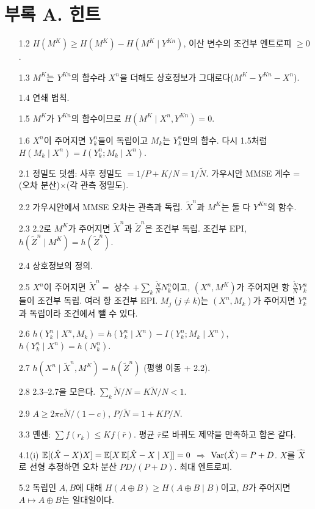 \newpage
\section*{부록 A. 힌트}
\begin{itemize}[leftmargin=2.2em]
\item[1.2] $H(M^K)\ge H(M^K)-H(M^K\mid Y^{Kn})$, 이산 변수의 조건부 엔트로피 $\ge0$.
\item[1.3] $M^K$는 $Y^{Kn}$의 함수라 $X^n$을 더해도 상호정보가 그대로다($M^K-Y^{Kn}-X^n$).
\item[1.4] 연쇄 법칙.
\item[1.5] $M^K$가 $Y^{Kn}$의 함수이므로 $H(M^K\mid X^n,Y^{Kn})=0$.
\item[1.6] $X^n$이 주어지면 $Y_k^n$들이 독립이고 $M_k$는 $Y_k^n$만의 함수. 다시 1.5처럼 $H(M_k\mid X^n)=I(Y_k^n;M_k\mid X^n)$.
\item[2.1] 정밀도 덧셈: 사후 정밀도 $=1/P+K/N=1/\tilde N$. 가우시안 MMSE 계수 = (오차 분산)$\times$(각 관측 정밀도).
\item[2.2] 가우시안에서 MMSE 오차는 관측과 독립. $\tilde X^n$과 $M^K$는 둘 다 $Y^{Kn}$의 함수.
\item[2.3] 2.2로 $M^K$가 주어지면 $\tilde X^n$과 $\tilde Z^n$은 조건부 독립. 조건부 EPI, $h(\tilde Z^n\mid M^K)=h(\tilde Z^n)$.
\item[2.4] 상호정보의 정의.
\item[2.5] $X^n$이 주어지면 $\tilde X^n=$ 상수 $+\sum_k\frac{\tilde N}NN_k^n$이고, $(X^n,M^K)$가 주어지면 항 $\frac{\tilde N}NY_k^n$들이 조건부 독립. 여러 항 조건부 EPI. $M_j$ ($j\ne k$)는 $(X^n,M_k)$가 주어지면 $Y_k^n$과 독립이라 조건에서 뺄 수 있다.
\item[2.6] $h(Y_k^n\mid X^n,M_k)=h(Y_k^n\mid X^n)-I(Y_k^n;M_k\mid X^n)$, $h(Y_k^n\mid X^n)=h(N_k^n)$.
\item[2.7] $h(X^n\mid\tilde X^n,M^K)=h(\tilde Z^n)$ (평행 이동 + 2.2).
\item[2.8] 2.3–2.7을 모은다. $\sum_k\tilde N/N=K\tilde N/N<1$.
\item[2.9] $A\ge2\pi e\tilde N/(1-c)$, $P/\tilde N=1+KP/N$.
\item[3.3] 옌센: $\sum f(r_k)\le Kf(\bar r)$. 평균 $\bar r$로 바꿔도 제약을 만족하고 합은 같다.
\item[4.1(i)] $\mathbb{E}[(\hat X-X)X]=\mathbb{E}[X\,\mathbb{E}[\hat X-X\mid X]]=0$ $\Rightarrow$ $\operatorname{Var}(\hat X)=P+D$. $X$를 $\hat X$로 선형 추정하면 오차 분산 $PD/(P+D)$. 최대 엔트로피.
\item[5.2] 독립인 $A,B$에 대해 $H(A\oplus B)\ge H(A\oplus B\mid B)$이고, $B$가 주어지면 $A\mapsto A\oplus B$는 일대일이다.
\end{itemize}

